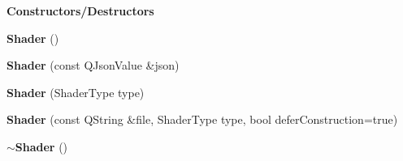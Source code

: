 \begin{Indent}\textbf{ Constructors/\+Destructors}\par
\begin{DoxyCompactItemize}
\item 
\mbox{\label{classrev_1_1_shader_ac29545fa09047ead7c139d8f3b559741}} 
{\bfseries Shader} ()
\item 
\mbox{\label{classrev_1_1_shader_ab89afb6f433019f7a4dcc4d4723e1555}} 
{\bfseries Shader} (const Q\+Json\+Value \&json)
\item 
\mbox{\label{classrev_1_1_shader_a96e1cdb5d480671cfe9652072e93c638}} 
{\bfseries Shader} (Shader\+Type type)
\item 
\mbox{\label{classrev_1_1_shader_a84ed48b1d703adfbd1903ea6c98fbcff}} 
{\bfseries Shader} (const Q\+String \&file, Shader\+Type type, bool defer\+Construction=true)
\item 
\mbox{\label{classrev_1_1_shader_ae1fe289f99f53e182197ec234eb8837c}} 
{\bfseries $\sim$\+Shader} ()
\end{DoxyCompactItemize}
\end{Indent}
